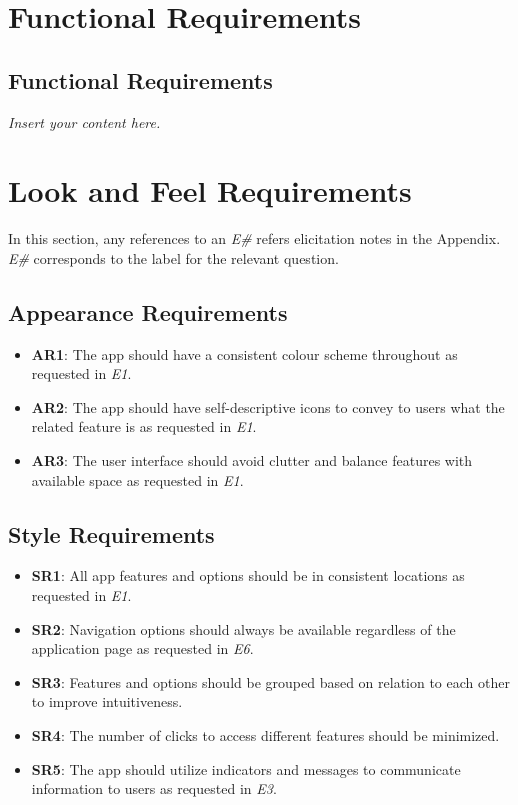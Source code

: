 \documentclass[12pt]{article}
\newcommand{\lips}{\textit{Insert your content here.}}
\begin{document}
\section{Functional Requirements}
\subsection{Functional Requirements}
\lips

\section{Look and Feel Requirements}
In this section, any references to an \textit{E\#} refers elicitation notes in the Appendix. \textit{E\#} corresponds
to the label for the relevant question.

\subsection{Appearance Requirements}
\begin{itemize}
  \item \textbf{AR1}: The app should have a consistent colour scheme throughout as requested in \textit{E1}.
  \item \textbf{AR2}: The app should have self-descriptive icons to convey to users what the related feature is as requested in \textit{E1}.
  \item \textbf{AR3}: The user interface should avoid clutter and balance features with available space as requested in \textit{E1}.
\end{itemize}
\subsection{Style Requirements}
\begin{itemize}
  \item \textbf{SR1}: All app features and options should be in consistent locations as requested in \textit{E1}.
  \item \textbf{SR2}: Navigation options should always be available regardless of the application page as requested in \textit{E6}.
  \item \textbf{SR3}: Features and options should be grouped based on relation to each other to improve intuitiveness.
  \item \textbf{SR4}: The number of clicks to access different features should be minimized.
  \item \textbf{SR5}: The app should utilize indicators and messages to communicate information to users as requested in \textit{E3}.
\end{itemize}
\end{document}
